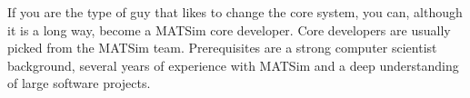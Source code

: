 If you are the type of guy that likes to change the core system, you can, although it is a long way, become a MATSim core developer. Core developers are usually picked from the MATSim team. Prerequisites are a strong computer scientist background, several years of experience with MATSim and a deep understanding of large software projects.

%
%
%
%
%
%
%
%

